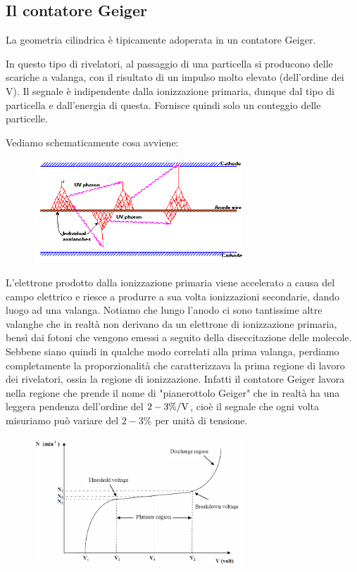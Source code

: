 \subsection{Il contatore Geiger}

La geometria cilindrica è tipicamente adoperata in un contatore Geiger.

In questo tipo di rivelatori, al passaggio di una particella si producono delle scariche a valanga, con il risultato di un impulso molto elevato (dell'ordine dei V). Il segnale è indipendente dalla ionizzazione primaria, dunque dal tipo di particella e dall'energia di questa. Fornisce quindi solo un conteggio delle particelle.

Vediamo schematicamente cosa avviene:
\begin{figure}[H]
   \centering
   \includegraphics[width=0.7\textwidth]{immagini/contatore_geiger_valanghe.png}
\end{figure}
L'elettrone prodotto dalla ionizzazione primaria viene accelerato a causa del campo elettrico e riesce a produrre a sua volta ionizzazioni secondarie, dando luogo ad una valanga. Notiamo che lungo l'anodo ci sono tantissime altre valanghe che in realtà non derivano da un elettrone di ionizzazione primaria, bensì dai fotoni che vengono emessi a seguito della diseccitazione delle molecole. Sebbene siano quindi in qualche modo correlati alla prima valanga, perdiamo completamente la proporzionalità che caratterizzava la prima regione di lavoro dei rivelatori, ossia la regione di ionizzazione. Infatti il contatore Geiger lavora nella regione che prende il nome di "pianerottolo Geiger" che in realtà ha una leggera pendenza dell'ordine del $2-3\%/ \rm V$, cioè il segnale che ogni volta misuriamo può variare del $2-3\%$ per unità di tensione. %
\begin{figure}[H]
   \centering
   \includegraphics[width=0.7\textwidth]{immagini/Geiger_plateau.png}
\end{figure}
